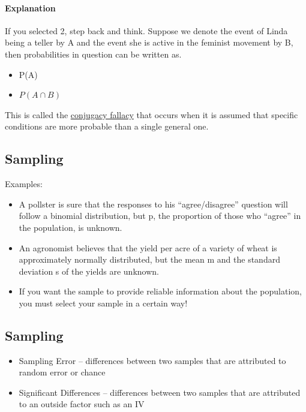 \documentclass[]{article}
\begin{document}
\paragraph{Explanation}\label{explanation-1}

If you selected 2, step back and think. Suppose we denote the event of
Linda being a teller by A and the event she is active in the feminist
movement by B, then probabilities in question can be written as.

\begin{itemize}
\itemsep1pt\parskip0pt
\item
  P(A)
\item
  $P(A \cap B)$
\end{itemize}

This is called the
\href{http://en.wikipedia.org/wiki/Conjunction_fallacy}{conjugacy
fallacy} that occurs when it is assumed that specific conditions are
more probable than a single general one.

\subsection{Sampling}\label{sampling}

Examples:

\begin{itemize}
\itemsep1pt\parskip0pt
\item
  A pollster is sure that the responses to his ``agree/disagree''
  question will follow a binomial distribution, but p, the proportion of
  those who ``agree'' in the population, is unknown.
\item
  An agronomist believes that the yield per acre of a variety of wheat
  is approximately normally distributed, but the mean m and the standard
  deviation s of the yields are unknown.
\item
  If you want the sample to provide reliable information about the
  population, you must select your sample in a certain way!
\end{itemize}

\subsection{Sampling}\label{sampling-1}

\begin{itemize}
\item
  Sampling Error -- differences between two samples that are attributed
  to random error or chance
\item
  Significant Differences -- differences between two samples that are
  attributed to an outside factor such as an IV
\end{itemize}
\end{document}

